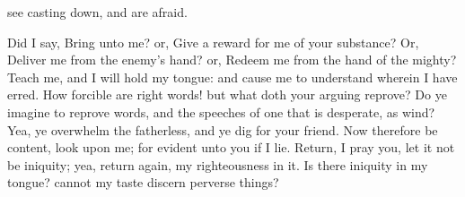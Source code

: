 {see
{} casting
down, and are
afraid.
\par }{\PP {}Did I
say,
Bring unto me? or, Give a
reward for me of your
substance?
Or,
Deliver me from the
enemy’s
hand? or,
Redeem me from the
hand of the
mighty?
Teach me, and I will hold my
tongue: and cause me to
understand wherein I have
erred.
How
forcible are
right
words! but what doth your
arguing
reprove?
Do ye
imagine to
reprove
words, and the
speeches of one that is
desperate,
{} as
wind?
Yea, ye
overwhelm the
fatherless, and ye
dig
{} for your
friend.
Now therefore be
content,
look upon me; for
{}
evident unto you if I
lie.
Return, I pray you, let it not be
iniquity; yea, return
again, my
righteousness
{} in it.
Is
there
iniquity in my
tongue? cannot my
taste
discern perverse
things?

}
